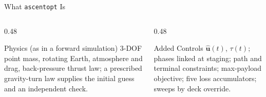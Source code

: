 \documentclass[aspectratio=169,10pt]{beamer}
\begin{document}
\begin{frame}{What \texttt{ascentopt} Is}
{}
  \vspace{4pt}
  \begin{columns}[T]
    \begin{column}{0.48\textwidth}
      \begin{block}{Physics (as in a forward simulation)}
        \footnotesize 3-DOF point mass, rotating Earth, atmosphere and drag, back-pressure thrust law; a prescribed gravity-turn law supplies the initial guess and an independent check.
      \end{block}
    \end{column}
    \begin{column}{0.48\textwidth}
      \begin{block}{Added}
        \footnotesize Controls $\hat{\bm u}(t)$, $\tau(t)$; phases linked at staging; path and terminal constraints; max-payload objective; five loss accumulators; sweeps by deck override.
      \end{block}
    \end{column}
  \end{columns}
\end{frame}
\end{document}
